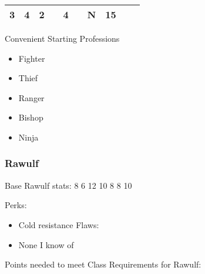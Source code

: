 \documentclass[12pt]{article}
\begin{document}
\begin{longtable}[]{@{}llllllllll@{}}
\begin{minipage}[t]{0.06\columnwidth}
3
\strut\end{minipage} &
\begin{minipage}[t]{0.06\columnwidth}\raggedright\strut
4
\strut\end{minipage} &
\begin{minipage}[t]{0.06\columnwidth}\raggedright\strut
2
\strut\end{minipage} &
\begin{minipage}[t]{0.06\columnwidth}\raggedright\strut
\strut\end{minipage} &
\begin{minipage}[t]{0.06\columnwidth}\raggedright\strut
4
\strut\end{minipage} &
\begin{minipage}[t]{0.06\columnwidth}\raggedright\strut
\strut\end{minipage} &
\begin{minipage}[t]{0.07\columnwidth}\raggedright\strut
N
\strut\end{minipage} &
\begin{minipage}[t]{0.08\columnwidth}\raggedright\strut
15
\strut\end{minipage}\tabularnewline
\bottomrule
\end{longtable}

Convenient Starting Professions

\begin{itemize}
\item
  Fighter
\item
  Thief
\item
  Ranger
\item
  Bishop
\item
  Ninja
\end{itemize}

\subsubsection{Rawulf}\label{rawulf}

Base Rawulf stats: 8 6 12 10 8 8 10

Perks:

\begin{itemize}
\item
  Cold resistance Flaws:
\item
  None I know of
\end{itemize}

Points needed to meet Class Requirements for Rawulf:
\end{document}
